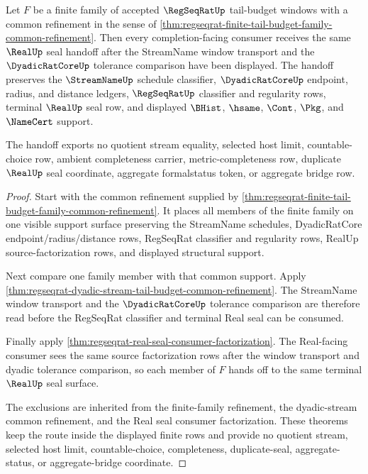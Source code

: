 \begin{theorem}
\label{thm:regseqrat-tail-refinement-handoff}
Let $F$ be a finite family of accepted $\RegSeqRatUp$ tail-budget windows with a common refinement in the sense of \autoref{thm:regseqrat-finite-tail-budget-family-common-refinement}. Then every completion-facing consumer receives the same $\RealUp$ seal handoff after the StreamName window transport and the $\DyadicRatCoreUp$ tolerance comparison have been displayed. The handoff preserves the $\StreamNameUp$ schedule classifier, $\DyadicRatCoreUp$ endpoint, radius, and distance ledgers, $\RegSeqRatUp$ classifier and regularity rows, terminal $\RealUp$ seal row, and displayed $\BHist$, $\hsame$, $\Cont$, $\Pkg$, and $\NameCert$ support.

The handoff exports no quotient stream equality, selected host limit, countable-choice row, ambient completeness carrier, metric-completeness row, duplicate $\RealUp$ seal coordinate, aggregate formalstatus token, or aggregate bridge row.
\end{theorem}
\begin{proof}
Start with the common refinement supplied by \autoref{thm:regseqrat-finite-tail-budget-family-common-refinement}. It places all members of the finite family on one visible support surface preserving the StreamName schedules, DyadicRatCore endpoint/radius/distance rows, RegSeqRat classifier and regularity rows, RealUp source-factorization rows, and displayed structural support.

Next compare one family member with that common support. Apply \autoref{thm:regseqrat-dyadic-stream-tail-budget-common-refinement}. The StreamName window transport and the $\DyadicRatCoreUp$ tolerance comparison are therefore read before the RegSeqRat classifier and terminal Real seal can be consumed.

Finally apply \autoref{thm:regseqrat-real-seal-consumer-factorization}. The Real-facing consumer sees the same source factorization rows after the window transport and dyadic tolerance comparison, so each member of $F$ hands off to the same terminal $\RealUp$ seal surface.

The exclusions are inherited from the finite-family refinement, the dyadic-stream common refinement, and the Real seal consumer factorization. These theorems keep the route inside the displayed finite rows and provide no quotient stream, selected host limit, countable-choice, completeness, duplicate-seal, aggregate-status, or aggregate-bridge coordinate.
\end{proof}

